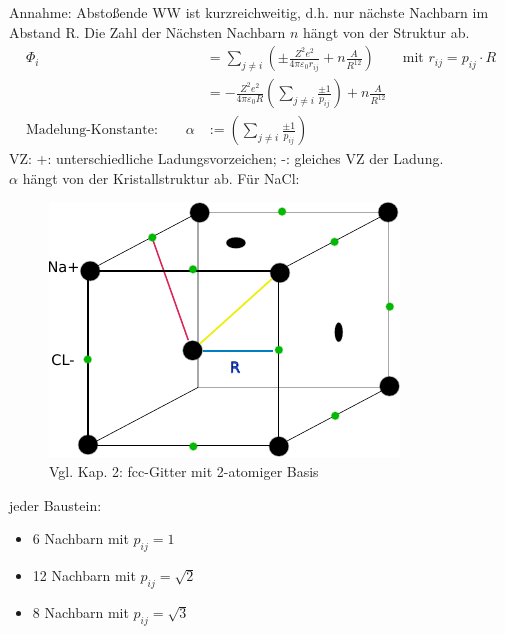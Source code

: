	Annahme: Abstoßende WW ist kurzreichweitig, d.h. nur nächste Nachbarn im Abstand R. Die Zahl der Nächsten Nachbarn $n$ hängt von der Struktur ab.
	\begin{align*}
		\Phi_i                                   & = \sum_{j \neq i} \left(\pm \frac{Z^2 e^2}{4 \pi \varepsilon_0 r_{ij}} + n\frac{A}{R^{12}}\right)
		\qquad \text{mit } r_{ij} = p_{ij} \cdot R                                                                                                                 \\
												& = - \frac{Z^2 e^2}{4 \pi \varepsilon_0 R} \left(\sum_{j \neq i} \frac{\pm 1}{p_{ij}}\right) + n\frac{A}{R^{12}} \\
		\text{Madelung-Konstante:} \qquad \alpha & := \left(\sum_{j \neq i} \frac{\pm 1}{p_{ij}}\right)
	\end{align*}
	VZ: +: unterschiedliche Ladungsvorzeichen; -: gleiches VZ der Ladung.\\
	$\alpha$ hängt von der Kristallstruktur ab. Für NaCl:
	\begin{figure}
		\centering
		\includegraphics{figures/1_3NaCl.pdf}
		\caption{Vgl. Kap. 2: fcc-Gitter mit 2-atomiger Basis}
	\end{figure}
	jeder Baustein:
	\begin{itemize}
		\item 6 Nachbarn mit $p_{ij} =  1$
		\item 12 Nachbarn mit $p_{ij} =  \sqrt{2}$
		\item 8 Nachbarn mit $p_{ij} =  \sqrt{3}$
	\end{itemize}

